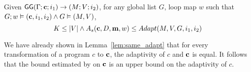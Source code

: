 \begin{coro}
Given $ \mathsf{GG}{(\Gamma; {\bf{{c}}}; i_1 )}\to {(M; V;i_2)}$,  for any global list $G$,  loop map $w$ such that \\ $G ;w \vDash ({\bf{{c}}}, i_1, i_2) \land G \vDash (M,V)$,
\[
K \leq |V| \land A_s({\bf{{c}}}, D, {\bf{{m}}}, w) \leq Adapt(M, V,G,i_1, i_2)
\]      
\end{coro}
We have already shown in Lemma~\ref{lem:same_adapt} that for every transformation of a program $c$ to ${\bf{{c}}}$, the adaptivity of $c$ and ${\bf{{c}}}$ is equal. It follows that the bound estimated by {\ADAPTSYSTEM} on ${\bf{{c}}}$ is an upper bound on the adaptivity of $c$.  

